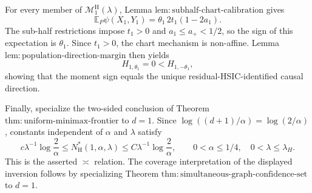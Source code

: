For every member of \(\mathcal M_1^{\mathrm H}(\lambda)\), Lemma \(\mathrm{lem:subhalf\text{-}chart\text{-}calibration}\) gives
\[
\mathbb E_P\psi(X_1,Y_1)=\theta_1\,2t_1(1-2a_1).
\]
The sub-half restrictions impose \(t_1>0\) and \(a_1\le a_+<1/2\), so the sign of this expectation is \(\theta_1\).  Since \(t_1>0\), the chart mechanism is non-affine.  Lemma \(\mathrm{lem:population\text{-}direction\text{-}margin}\) then yields
\[
H_{1,\theta_1}=0<H_{1,-\theta_1},
\]
showing that the moment sign equals the unique residual-HSIC-identified causal direction.

Finally, specialize the two-sided conclusion of Theorem \(\mathrm{thm:uniform\text{-}minimax\text{-}frontier}\) to \(d=1\).  Since \(\log((d+1)/\alpha)=\log(2/\alpha)\), constants independent of \(\alpha\) and \(\lambda\) satisfy
\[
c\lambda^{-1}\log\frac2\alpha
\le N_{\mathrm H}^*(1,\alpha,\lambda)
\le C\lambda^{-1}\log\frac2\alpha,
\qquad
0<\alpha\le1/4,\quad 0<\lambda\le\lambda_H.
\]
This is the asserted \(\asymp\) relation.  The coverage interpretation of the displayed inversion follows by specializing Theorem \(\mathrm{thm:simultaneous\text{-}graph\text{-}confidence\text{-}set}\) to \(d=1\).
